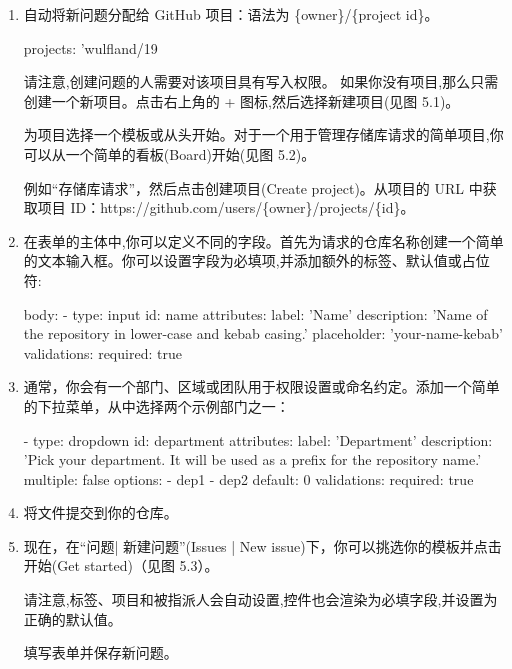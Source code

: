 \begin{enumerate}
\item 
自动将新问题分配给 GitHub 项目：语法为 \{owner\}/\{project id\}。

\begin{shell}
projects: 'wulfland/19
\end{shell}

请注意,创建问题的人需要对该项目具有写入权限。
如果你没有项目,那么只需创建一个新项目。点击右上角的 + 图标,然后选择新建项目(见图 5.1)。


为项目选择一个模板或从头开始。对于一个用于管理存储库请求的简单项目,你可以从一个简单的看板(Board)开始(见图 5.2)。


例如“存储库请求”，然后点击创建项目(Create project)。从项目的 URL 中获取项目 ID：https://github.com/users/\{owner\}/projects/\{id\}。

\item 
在表单的主体中,你可以定义不同的字段。首先为请求的仓库名称创建一个简单的文本输入框。你可以设置字段为必填项,并添加额外的标签、默认值或占位符:

\begin{shell}
body:
  - type: input
    id: name
    attributes:
      label: 'Name'
      description: 'Name of the repository in lower-case and
kebab casing.'
      placeholder: 'your-name-kebab'
    validations:
      required: true
\end{shell}

\item 
通常，你会有一个部门、区域或团队用于权限设置或命名约定。添加一个简单的下拉菜单，从中选择两个示例部门之一：

\begin{shell}
- type: dropdown
  id: department
  attributes:
    label: 'Department'
    description: 'Pick your department. It will be used as a   prefix for the repository name.'
    multiple: false
    options:
      - dep1
      - dep2
    default: 0
  validations:
    required: true
\end{shell}

\item 
将文件提交到你的仓库。

\item 
现在，在“问题| 新建问题”(Issues | New issue)下，你可以挑选你的模板并点击开始(Get started)（见图 5.3）。


请注意,标签、项目和被指派人会自动设置,控件也会渲染为必填字段,并设置为正确的默认值。


填写表单并保存新问题。

\end{enumerate}

